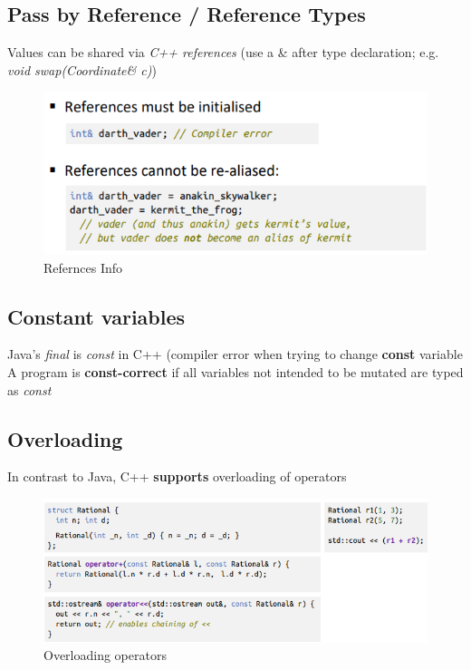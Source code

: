 \documentclass[a4paper,10pt]{article}
\begin{document}
\subsection{Pass by Reference / Reference Types}
Values can be shared via \textit{C++ references} (use a \& after type declaration; e.g. \textit{void swap(Coordinate\& c)})
\begin{figure}[htp]
    \centering
    \includegraphics[width=12cm]{e4.png}
    \caption{Refernces Info}
    \label{fig:enter-label}
\end{figure}
\subsection{Constant variables}
Java's \textit{final} is \textit{const} in C++ (compiler error when trying to change \textbf{const} variable\\
A program is \textbf{const-correct} if all variables not intended to be mutated are typed as \textit{const}
\subsection{Overloading}
In contrast to Java, C++ \textbf{supports} overloading of operators
\begin{figure}[htp]
    \centering
    \includegraphics[width=15cm]{e5.png}
    \caption{Overloading operators}
    \label{fig:enter-label}
\end{figure}
\end{document}
